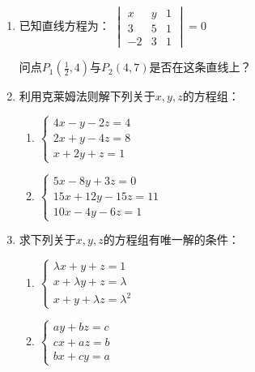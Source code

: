 \begin{enumerate}
\item 已知直线方程为：
$\begin{vmatrix}x&y&1\\3&5&1\\-2&3&1\end{vmatrix}=0$

问点$P_1\left(\frac{1}{2},4\right)$与$P_2(4,7)$是否在这条直线上？

\item 利用克莱姆法则解下列关于$x,y,z$的方程组：
\begin{multicols}{2}
\begin{enumerate}[(1)]
  \item $\begin{cases}4x-y-2z=4\\2x+y-4z=8\\
    x+2y+z=1\end{cases}$
  \item $\begin{cases}5x-8y+3z=0\\15x+12y-15z=11\\10x-4y-6z=1\end{cases}$
\end{enumerate}
\end{multicols}

\item 求下列关于$x,y,z$的方程组有唯一解的条件：
\begin{multicols}{2}
\begin{enumerate}[(1)]
  \item $\begin{cases}\lambda x+y+z=1\\x+\lambda y+z=\lambda\\x+y+\lambda z=\lambda^{2}\end{cases}$
  \item $\begin{cases}ay+bz=c\\cx+az=b\\bx+cy=a\end{cases}$
\end{enumerate}
\end{multicols}
\end{enumerate}
